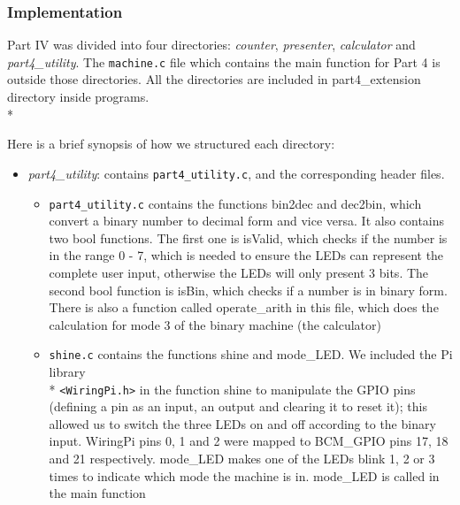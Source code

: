 \documentclass[letterpaper,11pt]{article}
\begin{document}
    \subsubsection{Implementation}
    Part IV was divided into four directories: \textit{counter}, \textit{presenter}, \textit{calculator} and \textit{part4\_utility}. The \texttt{machine.c} file which contains the main function for Part 4 is outside those directories. All the directories are included in part4\_extension directory inside programs.\\*

    \noindent Here is a brief synopsis of how we structured each directory:

    \begin{itemize}
        \item \textit{part4\_utility}: contains \texttt{part4\_utility.c},  and the corresponding header files.
        \begin{itemize}
            \item \texttt{part4\_utility.c} contains the functions bin2dec and dec2bin, which convert a binary number to decimal form and vice versa. It also contains two bool functions. The first one is isValid, which checks if the number is in the range 0 - 7, which is needed to ensure the LEDs can represent the complete user input, otherwise the LEDs will only present 3 bits. The second bool function is isBin, which checks if a number is in binary form. There is also a function called operate\_arith in this file, which does the calculation for mode 3 of the binary machine (the calculator)

            \item \texttt{shine.c} contains the functions shine and mode\_LED. We included the Pi library \\* \texttt{<WiringPi.h>} in the function shine to manipulate the GPIO pins (defining a pin as an input, an output and clearing it to reset it); this allowed us to switch the three LEDs on and off according to the binary input. WiringPi pins 0, 1 and 2 were mapped to BCM\_GPIO pins 17, 18 and 21 respectively. mode\_LED makes one of the LEDs blink 1, 2 or 3 times to indicate which mode the machine is in. mode\_LED is called in the main function
        \end{itemize}


\end{itemize}
\end{document}
